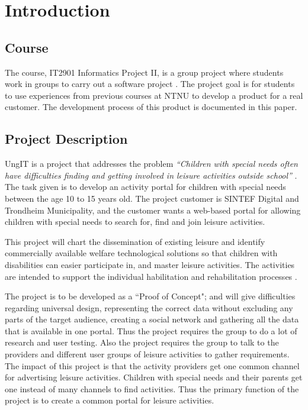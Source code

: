 
\chapter{Introduction}

\section{Course}
The course, IT2901 Informatics Project II, is a group project where students work in groups to carry out a software project \cite{EmneKode}. The project goal is for students to use experiences from previous courses at NTNU to develop a product for a real customer. The development process of this product is documented in this paper.


\section{Project Description}
UngIT is a project that addresses the problem \textit{“Children with special needs often have difficulties finding and getting involved in leisure activities outside school”} \cite{SintefBachelorProjectDescription}. The task given is to develop an activity portal for children with special needs between the age 10 to 15 years old. The project customer is SINTEF Digital and Trondheim Municipality, and the customer wants a web-based portal for allowing children with special needs to search for, find and join leisure activities.  

This project will chart the dissemination of existing leisure and identify commercially available welfare technological solutions so that children with disabilities can easier participate in, and master leisure activities. The activities are intended to support the individual habilitation and rehabilitation processes \cite{SintefOnlineProjectDescription}.

The project is to be developed as a “Proof of Concept"; and will give difficulties regarding universal design, representing the correct data without excluding any parts of the target audience, creating a social network and gathering all the data that is available in one portal. Thus the project requires the group to do a lot of research and user testing. Also the project requires the group to talk to the providers and different user groups of leisure activities to gather requirements. The impact of this project is that the activity providers get one common channel for advertising leisure activities. Children with special needs and their parents get one instead of many channels to find activities. Thus the primary function of the project is to create a common portal for leisure activities.

